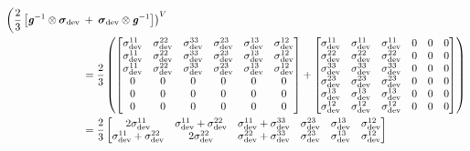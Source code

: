 \begin{equation}
  \begin{split}
    \left(\dfrac{2}{3}\left[ {\boldsymbol{\mathit{g}}}^{-1} \otimes \boldsymbol{\mathit{\sigma}}_{\operatorname{dev}} \right.\right.&+\left.\left. \boldsymbol{\mathit{\sigma}}_{\operatorname{dev}} \otimes {\ensuremath{\boldsymbol{\mathit{g}}}}^{-1} \right]\right)^{V}\\
    &=\dfrac{2}{3}\left( \begin{bmatrix}
        \sigma_{\operatorname{dev}}^{11} & \sigma_{\operatorname{dev}}^{22} & \sigma_{\operatorname{dev}}^{33} &
    \sigma_{\operatorname{dev}}^{23} & \sigma_{\operatorname{dev}}^{13} & \sigma_{\operatorname{dev}}^{12} \\
    \sigma_{\operatorname{dev}}^{11} & \sigma_{\operatorname{dev}}^{22} & \sigma_{\operatorname{dev}}^{33} &
    \sigma_{\operatorname{dev}}^{23} & \sigma_{\operatorname{dev}}^{13} & \sigma_{\operatorname{dev}}^{12} \\
    \sigma_{\operatorname{dev}}^{11} & \sigma_{\operatorname{dev}}^{22} & \sigma_{\operatorname{dev}}^{33} &
    \sigma_{\operatorname{dev}}^{23} & \sigma_{\operatorname{dev}}^{13} & \sigma_{\operatorname{dev}}^{12} \\
    0 & 0 & 0 & 0 & 0 & 0 \\
    0 & 0 & 0 & 0 & 0 & 0 \\
    0 & 0 & 0 & 0 & 0 & 0
    \end{bmatrix}+\begin{bmatrix}
    \sigma_{\operatorname{dev}}^{11} & \sigma_{\operatorname{dev}}^{11} & \sigma_{\operatorname{dev}}^{11} & 0 & 0 & 0\\
    \sigma_{\operatorname{dev}}^{22} & \sigma_{\operatorname{dev}}^{22} & \sigma_{\operatorname{dev}}^{22} & 0 & 0 & 0\\
    \sigma_{\operatorname{dev}}^{33} & \sigma_{\operatorname{dev}}^{33} & \sigma_{\operatorname{dev}}^{33} & 0 & 0 & 0\\
    \sigma_{\operatorname{dev}}^{23} & \sigma_{\operatorname{dev}}^{23} & \sigma_{\operatorname{dev}}^{23} & 0 & 0 & 0\\
    \sigma_{\operatorname{dev}}^{13} & \sigma_{\operatorname{dev}}^{13} & \sigma_{\operatorname{dev}}^{13} & 0 & 0 & 0\\
    \sigma_{\operatorname{dev}}^{12} & \sigma_{\operatorname{dev}}^{12} & \sigma_{\operatorname{dev}}^{12} & 0 & 0 & 0
    \end{bmatrix} \right)\\
    &=\dfrac{2}{3}\begin{bmatrix}
     2\sigma_{\operatorname{dev}}^{11} & \sigma_{\operatorname{dev}}^{11}+\sigma_{\operatorname{dev}}^{22} &
      \sigma_{\operatorname{dev}}^{11}+\sigma_{\operatorname{dev}}^{33} & \sigma_{\operatorname{dev}}^{23} &
      \sigma_{\operatorname{dev}}^{13} & \sigma_{\operatorname{dev}}^{12} \\
      \sigma_{\operatorname{dev}}^{11}+\sigma_{\operatorname{dev}}^{22} & 2\sigma_{\operatorname{dev}}^{22} &
      \sigma_{\operatorname{dev}}^{22}+\sigma_{\operatorname{dev}}^{33} & \sigma_{\operatorname{dev}}^{23} &
      \sigma_{\operatorname{dev}}^{13} & \sigma_{\operatorname{dev}}^{12} \\

\end{bmatrix}
\end{split}
\end{equation}
